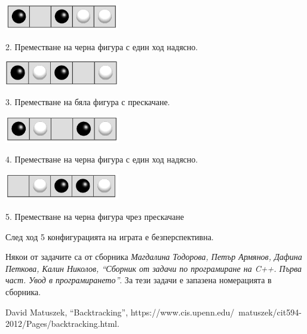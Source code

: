 \documentclass[12pt,a4paper]{article}
\begin{document}
\begin{enumerate}
	\begin{flushleft}
	\includegraphics[width=5cm]{images/step1}

	2. Преместване на черна фигура с един ход надясно.
	\end{flushleft}

	\begin{flushleft}
	\includegraphics[width=5cm]{images/step2}

	\relscale{0.8}
	3. Преместване на бяла фигура с прескачане.
	\end{flushleft}

	\begin{flushleft}
	\includegraphics[width=5cm]{images/step3}

	4. Преместване на черна фигура с един ход надясно.
	\end{flushleft}

	\begin{flushleft}
	\includegraphics[width=5cm]{images/step4}

	\relscale{0.8}
	5. Преместване на черна фигура чрез прескачане
	\end{flushleft}

	След ход 5 конфигурацията на играта е безперспективна.


\end{enumerate}


	\vspace{20px}

	\small{Някои от задачите са от сборника \textit{Магдалина Тодорова, Петър Армянов, Дафина Петкова, Калин Николов, ``Сборник от задачи по програмиране на C++. Първа част. Увод в програмирането''}. За тези задачи е запазена номерацията в сборника.}

\begin{thebibliography}{99}

	David Matuszek, ``Backtracking'', https://www.cis.upenn.edu/~matuszek/cit594-2012/Pages/backtracking.html.

\end{thebibliography}
\end{document}

